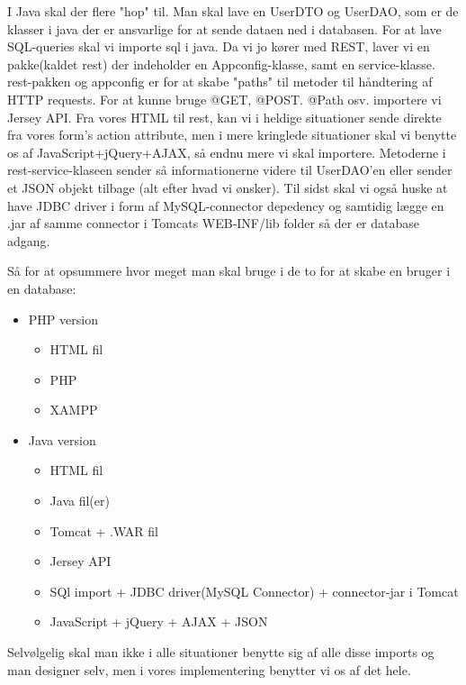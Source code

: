 \documentclass[12pt,a4paper]{report} %
\begin{document}
    I Java skal der flere "hop" til. Man skal lave en UserDTO og UserDAO, som er de klasser i java der er ansvarlige for at sende dataen ned i databasen. For at lave SQL-queries skal vi importe sql i java. Da vi jo kører med REST, laver vi en pakke(kaldet rest) der indeholder en Appconfig-klasse, samt en service-klasse. rest-pakken og appconfig er for at skabe "paths" til metoder til håndtering af HTTP requests. For at kunne bruge @GET, @POST. @Path osv. importere vi Jersey API. Fra vores HTML til rest, kan vi i heldige situationer sende direkte fra vores form's action attribute, men i mere kringlede situationer skal vi benytte os af JavaScript+jQuery+AJAX, så endnu mere vi skal importere. Metoderne i rest-service-klaseen sender så informationerne videre til UserDAO'en eller sender et JSON objekt tilbage (alt efter hvad vi ønsker). Til sidst skal vi også huske at have JDBC driver i form af MySQL-connector depedency og samtidig lægge en .jar af samme connector i Tomcats WEB-INF/lib folder så der er database adgang. 
    
    Så for at opsummere hvor meget man skal bruge i de to for at skabe en bruger i en database: \\
    \begin{itemize}
        \item PHP version
        \begin{itemize}
            \item HTML fil
            \item PHP 
            \item XAMPP
        \end{itemize}
        \item Java version
        \begin{itemize}
            \item HTML fil
            \item Java fil(er)
            \item Tomcat + .WAR fil
            \item Jersey API
            \item SQl import + JDBC driver(MySQL Connector) + connector-jar i Tomcat
            \item JavaScript + jQuery + AJAX + JSON
        \end{itemize}
   
    \end{itemize}
    
    \noindent Selvølgelig skal man ikke i alle situationer benytte sig af alle disse imports og man designer selv, men i vores implementering benytter vi os af det hele.
    
\end{document}

